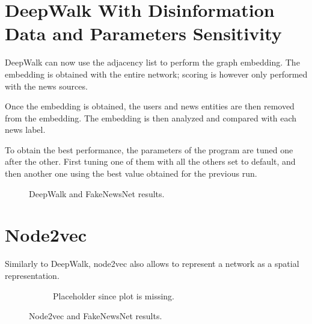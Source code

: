\section{DeepWalk With Disinformation Data and Parameters Sensitivity}

DeepWalk can now use the adjacency list to perform the graph embedding.
The embedding is obtained with the entire network; 
scoring is however only performed with the news sources.

Once the embedding is obtained, the users and news entities are then removed from the embedding.
The embedding is then analyzed and compared with each news label.

To obtain the best performance, the parameters of the program are tuned one after the other.
First tuning one of them with all the others set to default, and then another one using the best value obtained for the previous run.

\begin{figure}
    \centering
    \begin{subfigure}[b]{0.49\textwidth}
        \centering
        \scalebox{.5}{}
        \label{fig:deepwalk:representation and window size}
    \end{subfigure}
    \hfill
    \begin{subfigure}[b]{0.49\textwidth}
        \centering
        \scalebox{.5}{}
        \label{fig:deepwalk:number and walk length}
    \end{subfigure}
    \caption{DeepWalk and FakeNewsNet results.}
    \label{fig:deepwalk:plots}
\end{figure}

\section{Node2vec}
Similarly to DeepWalk, node2vec also allows to represent a network as a spatial representation.

\begin{figure}
    \centering
    \begin{subfigure}[b]{0.49\textwidth}
        \centering
        \scalebox{.5}{}
        \label{fig:node2vec:representation and window size}
    \end{subfigure}
    \hfill
    \begin{subfigure}[b]{0.49\textwidth}
        \centering
        \scalebox{.5}{}
        \label{fig:node2vec:number and walk length}
        \caption{Placeholder since plot is missing.}
    \end{subfigure}
    \caption{Node2vec and FakeNewsNet results.}
    \label{fig:deepwalk:plots}
\end{figure}

